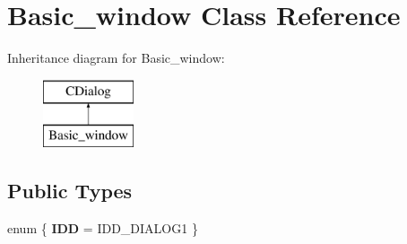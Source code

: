 \hypertarget{class_basic__window}{}\section{Basic\+\_\+window Class Reference}
\label{class_basic__window}
Inheritance diagram for Basic\+\_\+window\+:\begin{figure}[H]
\begin{center}
\leavevmode
\includegraphics[height=2.000000cm]{class_basic__window}
\end{center}
\end{figure}
\subsection*{Public Types}
\begin{DoxyCompactItemize}
\item 
\hypertarget{class_basic__window_a2fb129e769a0ea51892cf6ed9fa7d988}{}enum \{ {\bfseries I\+D\+D} = I\+D\+D\+\_\+\+D\+I\+A\+L\+O\+G1
 \}\label{class_basic__window_a2fb129e769a0ea51892cf6ed9fa7d988}

\end{DoxyCompactItemize}
